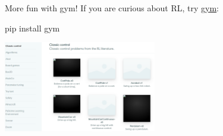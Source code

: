 \bgroup
\begin{frame}{More fun with gym!}
If you are curious about RL, try \href{https://github.com/openai/gym}{gym}:
\begin{center}
pip install gym
\end{center}
\centering
\includegraphics[width=0.5\textwidth]{img/gym.png}
\end{frame}
\egroup